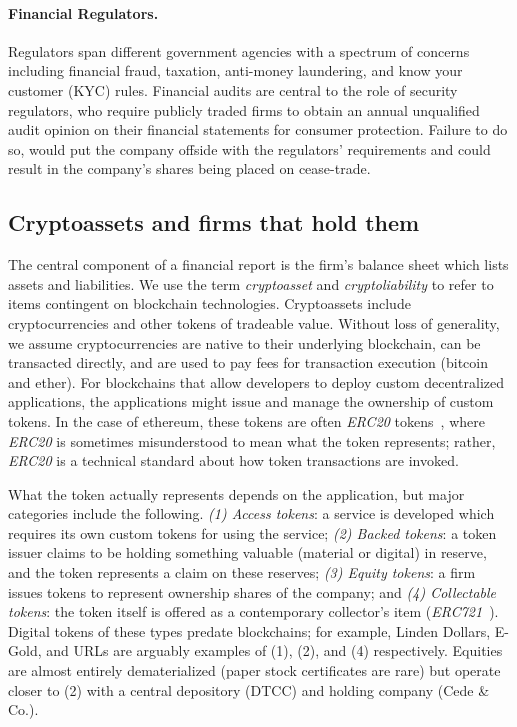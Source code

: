 \paragraph{Financial Regulators.} Regulators span different government agencies with a spectrum of concerns including financial fraud, taxation, anti-money laundering, and know your customer (KYC) rules. Financial audits are central to the role of security regulators, who require publicly traded firms to obtain an annual unqualified audit opinion on their financial statements for consumer protection. Failure to do so, would put the company offside with the regulators{'} requirements and could result in the company{'}s shares being placed on cease-trade. 


\subsection{Cryptoassets and firms that hold them}
The central component of a financial report is the firm's balance sheet which lists assets and liabilities. We use the term \textit{cryptoasset} and \textit{cryptoliability} to refer to items contingent on blockchain technologies. Cryptoassets include cryptocurrencies and other tokens of tradeable value. Without loss of generality, we assume cryptocurrencies are native to their underlying blockchain, can be transacted directly, and are used to pay fees for transaction execution (\eg bitcoin and ether). For blockchains that allow developers to deploy custom decentralized applications, the applications might issue and manage the ownership of custom tokens. In the case of ethereum, these tokens are often \textit{ERC20} tokens~\cite{erc20}, where \textit{ERC20} is sometimes misunderstood to mean what the token represents; rather, \textit{ERC20} is a technical standard about how token transactions are invoked.

What the token actually represents depends on the application, but major categories include the following. \textit{(1) Access tokens}: a service is developed which requires its own custom tokens for using the service; \textit{(2) Backed tokens}: a token issuer claims to be holding something valuable (material or digital) in reserve, and the token represents a claim on these reserves; \textit{(3) Equity tokens}: a firm issues tokens to represent ownership shares of the company; and \textit{(4) Collectable tokens}: the token itself is offered as a contemporary collector's item (\eg \textit{ERC721}~\cite{erc721}). Digital tokens of these types predate blockchains; for example, \textsf{Linden Dollars}, \textsf{E-Gold}, and URLs are arguably examples of (1), (2), and (4) respectively. Equities are almost entirely dematerialized (\eg paper stock certificates are rare) but operate closer to (2) with a central depository (\eg DTCC) and holding company (\eg Cede \& Co.).

